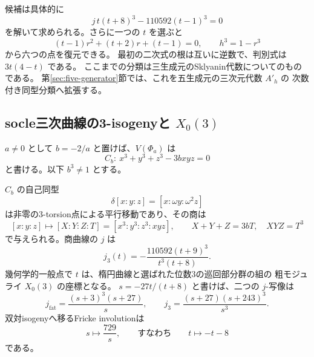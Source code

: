 候補は具体的に
\[
 j\,t(t+8)^3-110592(t-1)^3=0
\]
を解いて求められる。さらに一つの $t$ を選ぶと
\[
 (t-1)r^2+(t+2)r+(t-1)=0,\qquad h^3=1-r^3
\]
から六つの点を復元できる。
最初の二次式の根は互いに逆数で、判別式は $3t(4-t)$ である。
ここまでの分類は三生成元のSklyanin代数についてのものである。
第\ref{sec:five-generator}節では、これを五生成元の三次元代数 $A'_h$ の
次数付き同型分類へ拡張する。

\subsection{socle三次曲線の3-isogenyと \texorpdfstring{$X_0(3)$}{X0(3)}}

$a\ne0$ として $b=-2/a$ と置けば、$V(\Phi_a)$ は
\[
 C_b:\ x^3+y^3+z^3-3bxyz=0
\]
と書ける。以下 $b^3\ne1$ とする。

\begin{theorem}\label{thm:fat-three-isogeny}
$C_b$ の自己同型
\[
 \delta[x:y:z]=[x:\omega y:\omega^2z]
\]
は非零の3-torsion点による平行移動であり、その商は
\begin{equation}\label{eq:fat-isogeny-quotient}
 [x:y:z]\longmapsto[X:Y:Z:T]=[x^3:y^3:z^3:xyz],\qquad
 X+Y+Z=3bT,\quad XYZ=T^3
\end{equation}
で与えられる。商曲線の $j$ は
\begin{equation}\label{eq:fat-isogeny-j}
 j_3(t)=-\frac{110592(t+9)^3}{t^3(t+8)}.
\end{equation}
幾何学的一般点で $t$ は、楕円曲線と選ばれた位数3の巡回部分群の組の
粗モジュライ $X_0(3)$ の座標となる。
$s=-27t/(t+8)$ と書けば、二つの $j$-写像は
\begin{equation}\label{eq:x03-j-pair}
 j_{\mathrm{fat}}=\frac{(s+3)^3(s+27)}s,\qquad
 j_3=\frac{(s+27)(s+243)^3}{s^3}.
\end{equation}
双対isogenyへ移るFricke involutionは
\begin{equation}\label{eq:fat-fricke}
 s\longmapsto\frac{729}s,
 \qquad\text{すなわち}\qquad t\longmapsto-t-8
\end{equation}
である。
\end{theorem}

